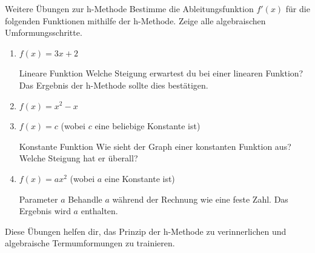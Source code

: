 \begin{aufgabenumgebung}{Weitere Übungen zur h-Methode}
Bestimme die Ableitungsfunktion $f'(x)$ für die folgenden Funktionen mithilfe der h-Methode. Zeige alle algebraischen Umformungsschritte.
\begin{enumerate}
    \item $f(x) = 3x + 2$ 
        \begin{tippumgebung}{Lineare Funktion}
        Welche Steigung erwartest du bei einer linearen Funktion? Das Ergebnis der h-Methode sollte dies bestätigen.
        \end{tippumgebung}
    \item $f(x) = x^2 - x$
    \item $f(x) = c$ (wobei $c$ eine beliebige Konstante ist)
        \begin{tippumgebung}{Konstante Funktion}
        Wie sieht der Graph einer konstanten Funktion aus? Welche Steigung hat er überall?
        \end{tippumgebung}
    \item $f(x) = ax^2$ (wobei $a$ eine Konstante ist)
        \begin{tippumgebung}{Parameter $a$}
        Behandle $a$ während der Rechnung wie eine feste Zahl. Das Ergebnis wird $a$ enthalten.
        \end{tippumgebung}
\end{enumerate}
Diese Übungen helfen dir, das Prinzip der h-Methode zu verinnerlichen und algebraische Termumformungen zu trainieren.
\end{aufgabenumgebung}


